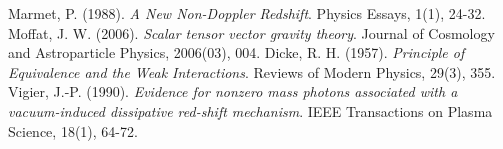 \documentclass[12pt,a4paper]{article}
\begin{document}
\begin{thebibliography}{99}
		 Marmet, P. (1988). \textit{A New Non-Doppler Redshift}. Physics Essays, 1(1), 24-32.
		 Moffat, J. W. (2006). \textit{Scalar tensor vector gravity theory}. Journal of Cosmology and Astroparticle Physics, 2006(03), 004.
		 Dicke, R. H. (1957). \textit{Principle of Equivalence and the Weak Interactions}. Reviews of Modern Physics, 29(3), 355.
		 Vigier, J.-P. (1990). \textit{Evidence for nonzero mass photons associated with a vacuum-induced dissipative red-shift mechanism}. IEEE Transactions on Plasma Science, 18(1), 64-72.
	\end{thebibliography}
	
\end{document}
